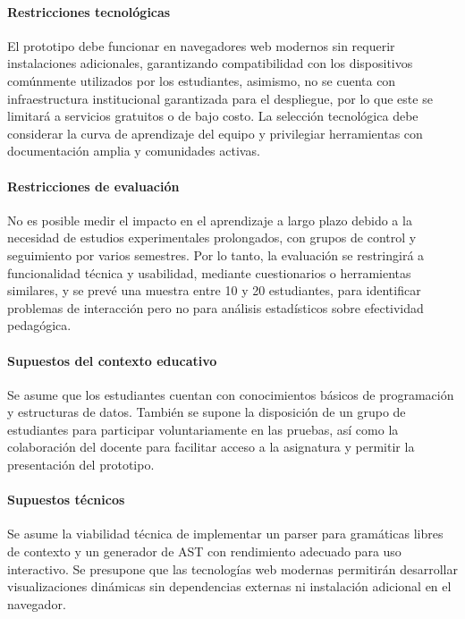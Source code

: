 \paragraph{Restricciones tecnológicas}

El prototipo debe funcionar en navegadores web modernos sin requerir instalaciones adicionales, garantizando compatibilidad con los dispositivos comúnmente utilizados por los estudiantes, asimismo, no se cuenta con infraestructura institucional garantizada para el despliegue, por lo que este se limitará a servicios gratuitos o de bajo costo. La selección tecnológica debe considerar la curva de aprendizaje del equipo y privilegiar herramientas con documentación amplia y comunidades activas.

\paragraph{Restricciones de evaluación}

No es posible medir el impacto en el aprendizaje a largo plazo debido a la necesidad de estudios experimentales prolongados, con grupos de control y seguimiento por varios semestres. Por lo tanto, la evaluación se restringirá a funcionalidad técnica y usabilidad, mediante cuestionarios o herramientas similares, y se prevé una muestra entre 10 y 20 estudiantes, para identificar problemas de interacción pero no para análisis estadísticos sobre efectividad pedagógica.

\paragraph{Supuestos del contexto educativo}

Se asume que los estudiantes cuentan con conocimientos básicos de programación y estructuras de datos. También se supone la disposición de un grupo de estudiantes para participar voluntariamente en las pruebas, así como la colaboración del docente para facilitar acceso a la asignatura y permitir la presentación del prototipo.

\paragraph{Supuestos técnicos}

Se asume la viabilidad técnica de implementar un parser para gramáticas libres de contexto y un generador de AST con rendimiento adecuado para uso interactivo. Se presupone que las tecnologías web modernas permitirán desarrollar visualizaciones dinámicas sin dependencias externas ni instalación adicional en el navegador.

